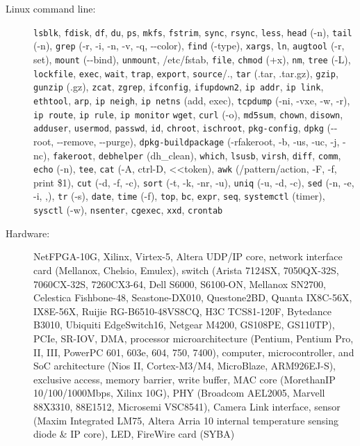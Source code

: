 \documentclass[letterpaper,11pt]{article}
\begin{document}
\begin{CJK}{UTF8}{gbsn}
\begin{description}
\item[Linux command line:] {\tt lsblk}, {\tt fdisk}, {\tt df}, {\tt du},
{\tt ps},
{\tt mkfs}, {\tt fstrim}, {\tt sync},
{\tt rsync}, {\tt less}, {\tt head} (-n), {\tt tail} (-n), {\tt grep} (-r, -i, -n, -v, -q, -{}-color),
{\tt find} (-type), {\tt xargs}, {\tt ln}, {\tt augtool} (-r, set),
{\tt mount} (-{}-bind), {\tt unmount}, /etc/fstab,
{\tt file}, {\tt chmod} (+x), {\tt nm}, {\tt tree} (-L), {\tt lockfile},
{\tt exec}, {\tt wait}, {\tt trap},
{\tt export}, {\tt source}/.,
{\tt tar} (.tar, .tar.gz), {\tt gzip}, {\tt gunzip} (.gz), {\tt zcat}, {\tt zgrep},
{\tt ifconfig}, {\tt ifupdown2}, {\tt ip addr}, {\tt ip link}, {\tt ethtool}, {\tt arp}, {\tt ip neigh}, {\tt ip netns} (add, exec),
{\tt tcpdump} (-ni, -vxe, -w, -r), {\tt ip route}, {\tt ip rule}, {\tt ip monitor}
{\tt wget}, {\tt curl} (-o), {\tt md5sum},
{\tt chown}, {\tt disown}, {\tt adduser}, {\tt usermod}, {\tt passwd}, {\tt id}, {\tt chroot}, {\tt ischroot},
{\tt pkg-config}, {\tt dpkg} (-{}-root, -{}-remove, -{}-purge),
{\tt dpkg-buildpackage} (-rfakeroot, -b, -us, -uc, -j, -nc), {\tt fakeroot}, {\tt debhelper} (dh\_clean),
{\tt which},
{\tt lsusb},
{\tt virsh},
{\tt diff}, {\tt comm},
{\tt echo} (-n), {\tt tee}, {\tt cat} (-A, ctrl-D, \textless\textless token), {\tt awk} (/pattern/action, -F, -f, print \$1), {\tt cut} (-d, -f, -c),
{\tt sort} (-t, -k, -nr, -u), {\tt uniq} (-u, -d, -c), {\tt sed} (-n, -e, -i, ,), {\tt tr} (-s),
{\tt date}, {\tt time} (-f),
{\tt top},
{\tt bc}, {\tt expr}, {\tt seq},
{\tt systemctl} (timer), {\tt sysctl} (-w),
{\tt nsenter}, {\tt cgexec},
{\tt xxd},
{\tt crontab}

\item[Hardware:] NetFPGA-10G, Xilinx, Virtex-5, Altera UDP/IP core, network interface card (Mellanox, Chelsio, Emulex),
switch (Arista 7124SX, 7050QX-32S, 7060CX-32S, 7260CX3-64, Dell S6000, S6100-ON, Mellanox SN2700,
Celestica Fishbone-48, Seastone-DX010, Questone2BD,
Quanta IX8C-56X, IX8E-56X, Ruijie RG-B6510-48VS8CQ, H3C TCS81-120F, Bytedance B3010,
Ubiquiti EdgeSwitch16, Netgear M4200, GS108PE, GS110TP), PCIe, SR-IOV, DMA,
processor microarchitecture (Pentium, Pentium Pro, II, III, PowerPC 601, 603e, 604, 750, 7400),
computer, microcontroller, and SoC architecture (Nios II, Cortex-M3/M4, MicroBlaze, ARM926EJ-S),
exclusive access, memory barrier, write buffer,
MAC core (MorethanIP 10/100/1000Mbps, Xilinx 10G),
PHY (Broadcom AEL2005, Marvell 88X3310, 88E1512, Microsemi VSC8541), Camera Link interface, sensor (Maxim Integrated LM75,
Altera Arria 10 internal temperature sensing diode \& IP core), LED,
FireWire card (SYBA)


\end{description}
\end{CJK}
\end{document}
